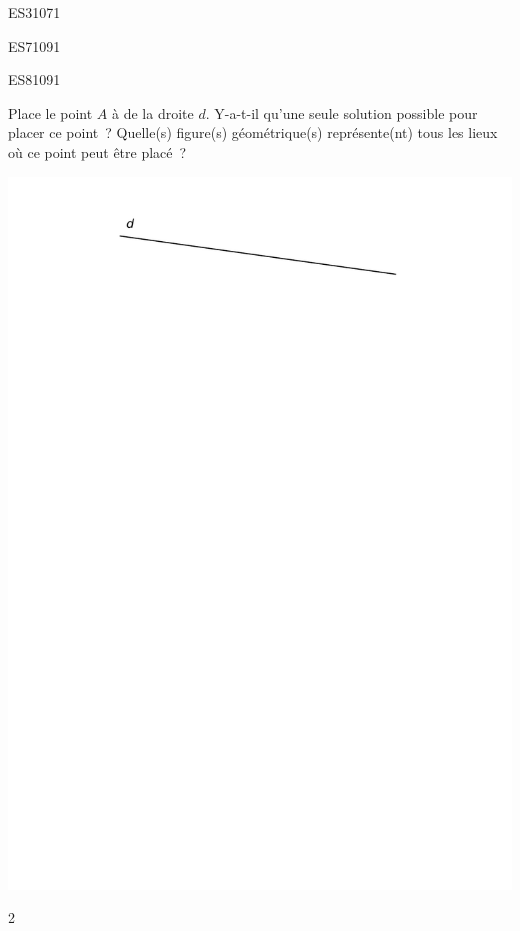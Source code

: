 \documentclass[a4paper,11pt]{report}
\begin{document}
\begin{exof}{ES3}{107}{1}
\end{exof}

\begin{exof}{ES7}{109}{1}
\end{exof}

\begin{exof}{ES8}{109}{1}
\end{exof}

\begin{exop}
{Place le point $A$ à  de la droite $d$. Y-a-t-il qu'une seule solution possible pour placer ce point~? Quelle(s) figure(s) géométrique(s) représente(nt) tous les lieux où ce point peut être placé~?


\begin{center}
\includegraphics[scale=0.8]{media/es-11/13-17}
\end{center}	
}
{2}
\end{exop}
\end{document}
